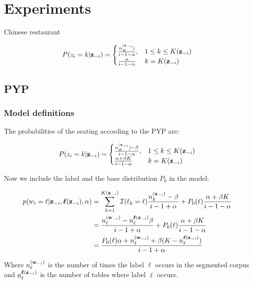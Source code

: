 \section{Experiments}
Chinese restaurant

\begin{align}
P(z_i=k|\bm{\mathbf{z}}_{-i}) = 
\begin{cases}
    \frac{n_K^{(\bm{\mathbf{z}}_{-i}})}{i - 1 - \alpha},& 1 \le k \le K(\bm{\mathbf{z}}_{-i})\\
    \frac{\alpha}{i - 1 - \alpha}              & k = K(\bm{\mathbf{z}}_{-i})\\
\end{cases}
\end{align}

\subsection{PYP}
\subsubsection{Model definitions}

The probabilities of the seating according to the PYP are:

\begin{align}
P(z_i=k|\bm{\mathbf{z}}_{-i}) = 
\begin{cases}
    \frac{n_K^{(\bm{\mathbf{z}}_{-i}}) - \beta}{i - 1 - \alpha},& 1 \le k \le K(\bm{\mathbf{z}}_{-i})\\
    \frac{\alpha + \beta K}{i - 1 - \alpha}              & k = K(\bm{\mathbf{z}}_{-i})\\
\end{cases}
\end{align}

Now we include the label and the base distribution $P_0$ in the model:

\begin{align}
p(w_i=\ell|\bm{\mathbf{z}}_{-i},\bm{\mathbf{\ell}}(\bm{\mathbf{z}}_{-i}),\alpha) &= \sum_{k=1}^{K(\bm{\mathbf{z}}_{-i})}\mathcal{I}(\ell_k=\ell)\dfrac{n_k^{(\bm{\mathbf{z}}_{-i})}-\beta}{i - 1 + \alpha} + P_0(\ell)\dfrac{\alpha + \beta K}{i -1 -\alpha} \\
&= \dfrac{n_{\ell}^{(\bm{\mathbf{w}}_{-i})}- n_{\ell}^{\bm{\mathbf{\ell}}(\bm{\mathbf{z}}_{-i})}\beta}{i - 1 + \alpha} + P_0(\ell)\dfrac{\alpha + \beta K}{i -1 -\alpha} \\
&= \dfrac{P_0(\ell)\alpha + n_{\ell}^{(\bm{\mathbf{w}}_{-i})}+ \beta (K - n_{\ell}^{\bm{\mathbf{\ell}}(\bm{\mathbf{z}}_{-i})})}{i - 1 + \alpha} 
\end{align}

Where $n_{\ell}^{(\bm{\mathbf{w}}_{-i})}$ is the number of times the label $\ell$ occurs in the segmented corpus and $n_{\ell}^{\bm{\mathbf{\ell}}(\bm{\mathbf{z}}_{-i})}$ is the number of tables where label $\ell$ occurs.

